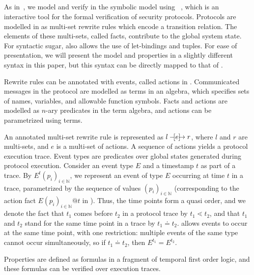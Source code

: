 \subsection{\mTamarin{}}
\label{sec:tamarin}
As in~\cite{Norr21}, we model and verify \mEdhoc{} in the symbolic model using \mTamarin{}~\cite{DBLP:conf/cav/MeierSCB13}, which is an interactive tool for the formal verification of security protocols.
%
Protocols are modelled in \mTamarin{} as multi-set rewrite rules which encode a transition relation.
%
The elements of these multi-sets, called facts, contribute to the global system state.
%
For syntactic sugar, \mTamarin{} also allows the use of let-bindings and tuples. 
%
For ease of presentation, we will present the model and properties in a slightly different syntax in this paper, but this syntax can be directly mapped to that of \mTamarin.


Rewrite rules can be annotated with events, called actions in \mTamarin{}.
%
Communicated messages in the protocol are modelled as terms in an algebra, which specifies sets of names, variables, and allowable function symbols.
%
Facts and actions are modelled as $n$-ary predicates in the term algebra, and actions can be parametrized using terms.

An annotated multi-set rewrite rule is represented as $l \ifarrow[e] r$, where $l$ and $r$ are multi-sets, and $e$ is a multi-set of actions.
%
A sequence of actions yields a protocol execution trace.
%
Event types are predicates over global states generated during protocol execution.
%
Consider an event type $E$ and a timestamp $t$ as part of a trace.
%
By $E^{t}(p_i)_{i\in\mathbb{N}}$, we represent an event of type $E$ occurring at time $t$ in a trace, parametrized by the sequence of values $(p_i)_{i\in\mathbb{N}}$ (corresponding to the action fact $E(p_i)_{i\in\mathbb{N}}@t$ in \mTamarin).
%
Thus, the time points form a quasi order, and we denote the fact that $t_{1}$ comes before $t_{2}$ in a protocol trace by $t_{1} \lessdot t_{2}$, and that $t_{1}$ and $t_{2}$ stand for the same time point in a trace by $t_{1} \doteq t_{2}$.
%
\mTamarin{} allows events to occur at the same time point, with one restriction: multiple events of the same type cannot occur simultaneously, so if $t_{1} \doteq t_{2}$, then $E^{t_{1}} = E^{t_{2}}$.


Properties are defined as formulas in a fragment of temporal first order logic, and these formulas can be verified over execution traces.

